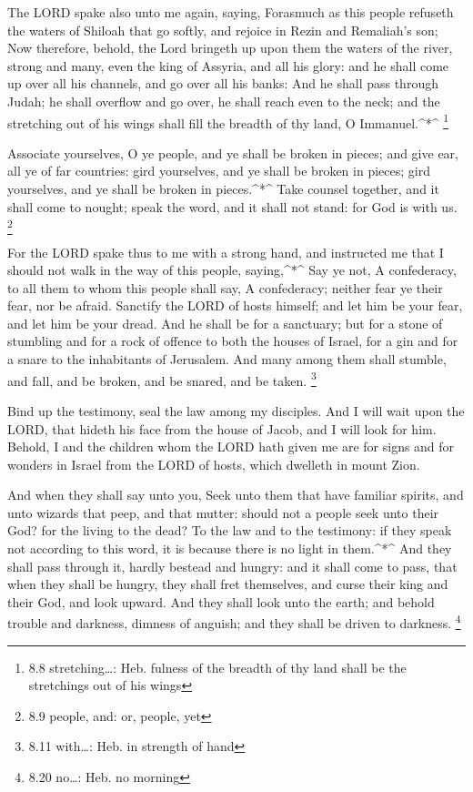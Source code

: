 The LORD spake also unto me again, saying, 
Forasmuch as this people refuseth the waters of Shiloah that go softly,
and rejoice in Rezin and Remaliah's son;  Now therefore,
behold, the Lord bringeth up upon them the waters of the river, strong
and many, even the king of Assyria, and all his glory: and he shall come
up over all his channels, and go over all his banks:  And he
shall pass through Judah; he shall overflow and go over, he shall reach
even to the neck; and the stretching out of his wings shall fill the
breadth of thy land, O Immanuel.\^{}*\^{} \footnote{8.8
  stretching\ldots: Heb. fulness of the breadth of thy land shall be the
  stretchings out of his wings}

 Associate yourselves, O ye people, and ye shall be broken
in pieces; and give ear, all ye of far countries: gird yourselves, and
ye shall be broken in pieces; gird yourselves, and ye shall be broken in
pieces.\^{}*\^{}  Take counsel together, and it shall come
to nought; speak the word, and it shall not stand: for God is with us.
\footnote{8.9 people, and: or, people, yet}

 For the LORD spake thus to me with a strong hand, and
instructed me that I should not walk in the way of this people,
saying,\^{}*\^{}  Say ye not, A confederacy, to all them to
whom this people shall say, A confederacy; neither fear ye their fear,
nor be afraid.  Sanctify the LORD of hosts himself; and let
him be your fear, and let him be your dread.  And he shall
be for a sanctuary; but for a stone of stumbling and for a rock of
offence to both the houses of Israel, for a gin and for a snare to the
inhabitants of Jerusalem.  And many among them shall
stumble, and fall, and be broken, and be snared, and be taken.
\footnote{8.11 with\ldots: Heb. in strength of hand}

 Bind up the testimony, seal the law among my disciples.
 And I will wait upon the LORD, that hideth his face from
the house of Jacob, and I will look for him.  Behold, I and
the children whom the LORD hath given me are for signs and for wonders
in Israel from the LORD of hosts, which dwelleth in mount Zion.

 And when they shall say unto you, Seek unto them that have
familiar spirits, and unto wizards that peep, and that mutter: should
not a people seek unto their God? for the living to the dead?
 To the law and to the testimony: if they speak not
according to this word, it is because there is no light in
them.\^{}*\^{}  And they shall pass through it, hardly
bestead and hungry: and it shall come to pass, that when they shall be
hungry, they shall fret themselves, and curse their king and their God,
and look upward.  And they shall look unto the earth; and
behold trouble and darkness, dimness of anguish; and they shall be
driven to darkness. \footnote{8.20 no\ldots: Heb. no morning}

